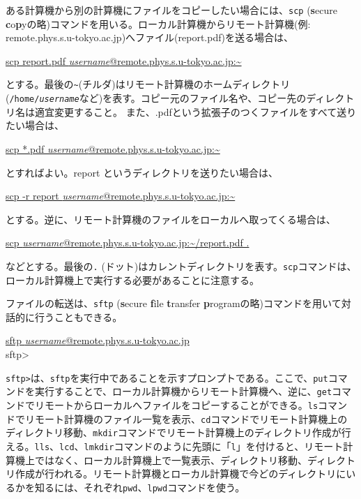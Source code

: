 ある計算機から別の計算機にファイルをコピーしたい場合には、\texttt{scp} (\textbf{s}ecure \textbf{c}o\textbf{p}yの略)コマンドを用いる。ローカル計算機からリモート計算機(例: remote.phys.s.u-tokyo.ac.jp)へファイル(report.pdf)を送る場合は、
\begin{commandline2}
    \prompt \underline{scp report.pdf \textit{username}@remote.phys.s.u-tokyo.ac.jp:\~{} }
\end{commandline2} \noindent
とする。最後の\texttt{\~{}}(チルダ)はリモート計算機のホームディレクトリ(\texttt{/home/\textit{username}}など)を表す。コピー元のファイル名や、コピー先のディレクトリ名は適宜変更すること。
また、.pdfという拡張子のつくファイルをすべて送りたい場合は、
\begin{commandline2}
    \prompt \underline{scp *.pdf \textit{username}@remote.phys.s.u-tokyo.ac.jp:\~{} }
\end{commandline2} \noindent
とすればよい。report というディレクトリを送りたい場合は、
\begin{commandline2}
    \prompt \underline{scp -r report \textit{username}@remote.phys.s.u-tokyo.ac.jp:\~{}}
\end{commandline2} \noindent
とする。逆に、リモート計算機のファイルをローカルへ取ってくる場合は、
\begin{commandline2}
    \prompt \underline{scp \textit{username}@remote.phys.s.u-tokyo.ac.jp:\~{}/report.pdf .}
\end{commandline2} \noindent
などとする。最後の\texttt{.} (ドット)はカレントディレクトリを表す。\texttt{scp}コマンドは、ローカル計算機上で実行する必要があることに注意する。

ファイルの転送は、\texttt{sftp} (\textbf{s}ecure \textbf{f}ile \textbf{t}ransfer \textbf{p}rogramの略)コマンドを用いて対話的に行うこともできる。
\begin{commandline2}
    \prompt \underline{sftp \textit{username}@remote.phys.s.u-tokyo.ac.jp} \\
    sftp>
\end{commandline2} \noindent
\texttt{sftp>}は、\texttt{sftp}を実行中であることを示すプロンプトである。ここで、\texttt{put}コマンドを実行することで、ローカル計算機からリモート計算機へ、逆に、\texttt{get}コマンドでリモートからローカルへファイルをコピーすることができる。\texttt{ls}コマンドでリモート計算機のファイル一覧を表示、\texttt{cd}コマンドでリモート計算機上のディレクトリ移動、\texttt{mkdir}コマンドでリモート計算機上のディレクトリ作成が行える。\texttt{lls}、\texttt{lcd}、\texttt{lmkdir}コマンドのように先頭に「\texttt{l}」を付けると、リモート計算機上ではなく、ローカル計算機上で一覧表示、ディレクトリ移動、ディレクトリ作成が行われる。リモート計算機とローカル計算機で今どのディレクトリにいるかを知るには、それぞれ\texttt{pwd}、\texttt{lpwd}コマンドを使う。

